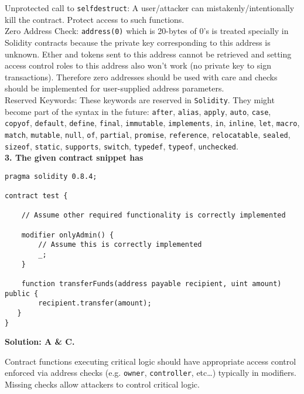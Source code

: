 Unprotected call to \verb|selfdestruct|: A user/attacker can mistakenly/intentionally kill the contract. Protect access to such functions.\\


Zero Address Check: \verb|address(0)| which is 20-bytes of 0's is treated specially in Solidity contracts because the private key corresponding to this address is unknown.
Ether and tokens sent to this address cannot be retrieved and setting access control roles to this address also won't work (no private key to sign transactions).
Therefore zero addresses should be used with care and checks should be implemented for user-supplied address parameters.\\

Reserved Keywords: These keywords are reserved in \verb|Solidity|. They might become part of the syntax in the future: \verb|after|, \verb|alias|, \verb|apply|, \verb|auto|, \verb|case|, \verb|copyof|, \verb|default|, \verb|define|, \verb|final|, \verb|immutable|, \verb|implements|, \verb|in|, \verb|inline|, \verb|let|, \verb|macro|, \verb|match|, \verb|mutable|, \verb|null|, \verb|of|, \verb|partial|, \verb|promise|, \verb|reference|, \verb|relocatable|, \verb|sealed|, \verb|sizeof|, \verb|static|, \verb|supports|, \verb|switch|, \verb|typedef|, \verb|typeof|, \verb|unchecked|.\\

\textbf{3. The given contract snippet has}\label{sec:exam4_q3}

\begin{lstlisting}[language=Solidity, style=solStyle]
pragma solidity 0.8.4;

contract test {

    // Assume other required functionality is correctly implemented

    modifier onlyAdmin() {
        // Assume this is correctly implemented
        _;
    }

    function transferFunds(address payable recipient, uint amount) public {
        recipient.transfer(amount);
   }
}
\end{lstlisting}

\textbf{Solution: A \& C.}

Contract functions executing critical logic should have appropriate access control enforced via address checks (e.g. \verb|owner|, \verb|controller|, etc\dots) typically in modifiers.
Missing checks allow attackers to control critical logic.\\

